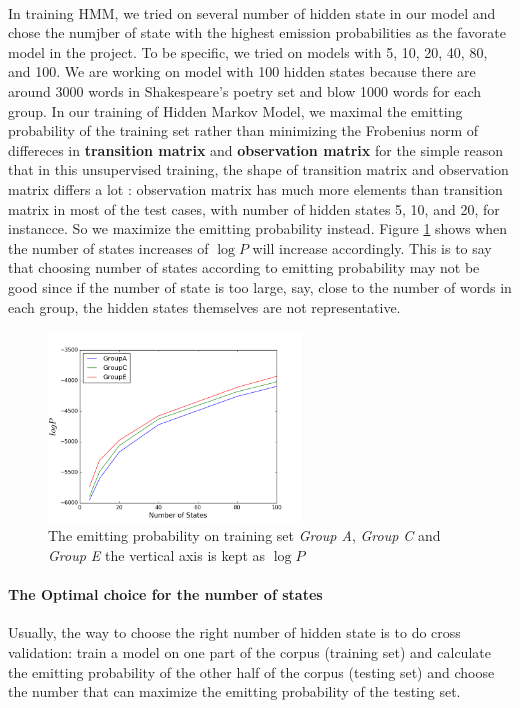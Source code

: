 %
\paragraph{}
In training HMM, we tried on several number of hidden state in our model and chose the numjber of state with the highest emission probabilities as the favorate model in the project. To be specific, we tried on models with 5, 10, 20, 40, 80, and 100. We are working on model with 100 hidden states because there are around 3000 words in Shakespeare's poetry set and blow 1000 words for each group. In our training of Hidden Markov Model,  we maximal the emitting probability of the training set rather than minimizing the Frobenius norm of differeces in \textbf{transition matrix} and \textbf{observation matrix} for the simple reason that in this unsupervised training, the shape of transition matrix and observation matrix differs a lot : observation matrix has much more elements than transition matrix in most of the test cases, with number of hidden states 5, 10, and 20, for
instancce. So we maximize the emitting probability instead. Figure \ref{fig:probability} shows when the number of states increases of $\log P$ will increase accordingly. This is to say that choosing number of states according to emitting probability may not be good since if the number of state is too large, say, close to the number of words in each group, the hidden states themselves are not representative.
 \begin{figure}[ht!]
 \centering
 \includegraphics[width=0.6\textwidth]{./figure/probability.png}
 \caption{The emitting probability on training set \textit{Group A}, \textit{Group C} and \textit{Group E} the vertical axis is kept as $\log P$\label{fig:probability}}
 \end{figure}
\paragraph{The Optimal choice for the number of states} Usually, the way to choose the right number of hidden state is to do cross validation: train a model on one part of the corpus (training set) and calculate the emitting probability of the other half of the corpus (testing set) and choose the number that can maximize the emitting probability of the testing set.


